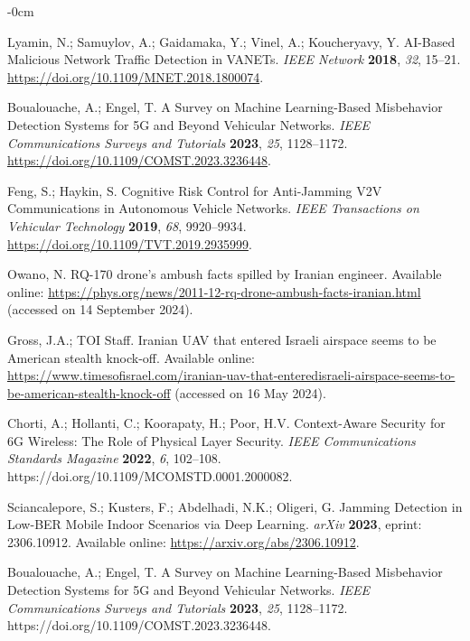 \documentclass[futureinternet,article,submit,pdftex,moreauthors]{Definitions/mdpi}
\begin{document}
\begin{adjustwidth}{-\extralength}{0cm}
\begin{thebibliography}{999}
Lyamin, N.; Samuylov, A.; Gaidamaka, Y.; Vinel, A.; Koucheryavy, Y. AI-Based Malicious Network Traffic Detection in VANETs. {\em IEEE Network} {\bf 2018}, {\em 32}, 15--21. \url{https://doi.org/10.1109/MNET.2018.1800074}.

Boualouache, A.; Engel, T. A Survey on Machine Learning-Based Misbehavior Detection Systems for 5G and Beyond Vehicular Networks. {\em IEEE Communications Surveys and Tutorials} {\bf 2023}, {\em 25}, 1128--1172. \url{https://doi.org/10.1109/COMST.2023.3236448}.

Feng, S.; Haykin, S. Cognitive Risk Control for Anti-Jamming V2V Communications in Autonomous Vehicle Networks. {\em IEEE Transactions on Vehicular Technology} {\bf 2019}, {\em 68}, 9920--9934. \url{https://doi.org/10.1109/TVT.2019.2935999}.

Owano, N. RQ-170 drone's ambush facts spilled by Iranian engineer. Available online: \url{https://phys.org/news/2011-12-rq-drone-ambush-facts-iranian.html} (accessed on 14 September 2024).

Gross, J.A.; TOI Staff. Iranian UAV that entered Israeli airspace seems to be American stealth knock-off. Available online: \url{https://www.timesofisrael.com/iranian-uav-that-enteredisraeli-airspace-seems-to-be-american-stealth-knock-off} (accessed on 16 May 2024).

Chorti, A.; Hollanti, C.; Koorapaty, H.; Poor, H.V. Context-Aware Security for 6G Wireless: The Role of Physical Layer Security. {\em IEEE Communications Standards Magazine} {\bf 2022}, {\em 6}, 102--108. https://doi.org/10.1109/MCOMSTD.0001.2000082.

Sciancalepore, S.; Kusters, F.; Abdelhadi, N.K.; Oligeri, G. Jamming Detection in Low-BER Mobile Indoor Scenarios via Deep Learning. {\em arXiv} {\bf 2023}, eprint: 2306.10912. Available online: \url{https://arxiv.org/abs/2306.10912}.

Boualouache, A.; Engel, T. A Survey on Machine Learning-Based Misbehavior Detection Systems for 5G and Beyond Vehicular Networks. {\em IEEE Communications Surveys and Tutorials} {\bf 2023}, {\em 25}, 1128--1172. https://doi.org/10.1109/COMST.2023.3236448.


\end{thebibliography}
\end{adjustwidth}
\end{document}
